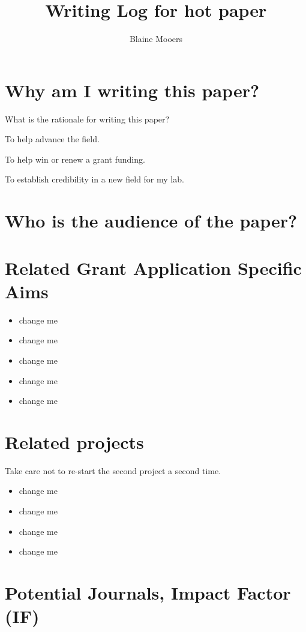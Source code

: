 \documentclass[10pt,letterpaper]{article}
\title{Writing Log for hot paper}
\author{Blaine Mooers}
\begin{document}
\maketitle

\tableofcontents

\section{Why am I writing this paper?}

What is the rationale for writing this paper?

To help advance the field.

To help win or renew a grant funding.

To establish credibility in a new field for my lab.

\section{Who is the audience of the paper?}

\section{Related Grant Application Specific Aims}

\begin{itemize}
\item change me
\item change me
\item change me
\item change me
\item change me
\end{itemize}

\section{Related projects}

Take care not to re-start the second project a second time.

\begin{itemize}
  \item change me
  \item change me
  \item change me
  \item change me
\end{itemize}


\section{Potential Journals, Impact Factor (IF)}
\end{document}
